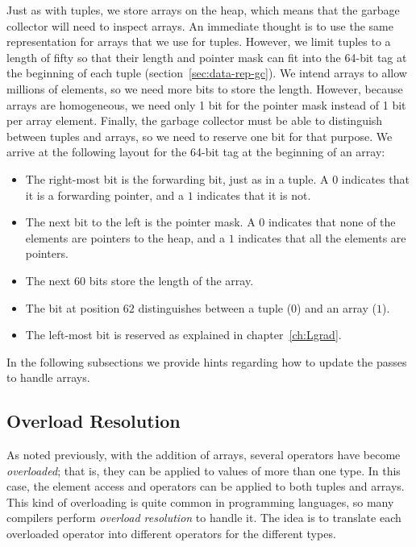 \documentclass[7x10]{TimesAPriori_MIT}%
\numberwithin{theorem}{chapter}
\numberwithin{definition}{chapter}
\numberwithin{equation}{chapter}
\begin{document}
Just as with tuples, we store arrays on the heap, which means that the
garbage collector will need to inspect arrays. An immediate thought is
to use the same representation for arrays that we use for tuples.
However, we limit tuples to a length of fifty so that their length and
pointer mask can fit into the 64-bit tag at the beginning of each
tuple (section~\ref{sec:data-rep-gc}). We intend arrays to allow
millions of elements, so we need more bits to store the length.
However, because arrays are homogeneous, we need only 1 bit for the
pointer mask instead of 1 bit per array element.  Finally, the
garbage collector must be able to distinguish between tuples
and arrays, so we need to reserve one bit for that purpose.  We
arrive at the following layout for the 64-bit tag at the beginning of
an array:
\begin{itemize}
\item The right-most bit is the forwarding bit, just as in a tuple.
  A $0$ indicates that it is a forwarding pointer, and a $1$ indicates
  that it is not.
  
\item The next bit to the left is the pointer mask. A $0$ indicates
  that none of the elements are pointers to the heap, and a $1$
  indicates that all the elements are pointers.

\item The next $60$ bits store the length of the array.

\item The bit at position $62$ distinguishes between a tuple ($0$)
  and an array ($1$).

\item The left-most bit is reserved as explained in
  chapter~\ref{ch:Lgrad}.
\end{itemize}



In the following subsections we provide hints regarding how to update
the passes to handle arrays.

\subsection{Overload Resolution}
\label{sec:array-resolution}

As noted previously, with the addition of arrays, several operators
have become \emph{overloaded}; that is, they can be applied to values
of more than one type. In this case, the element access and 
operators can be applied to both tuples and arrays. This kind of
overloading is quite common in programming languages, so many
compilers perform \emph{overload resolution} to handle it. The idea is to translate each overloaded
operator into different operators for the different types.
\end{document}

